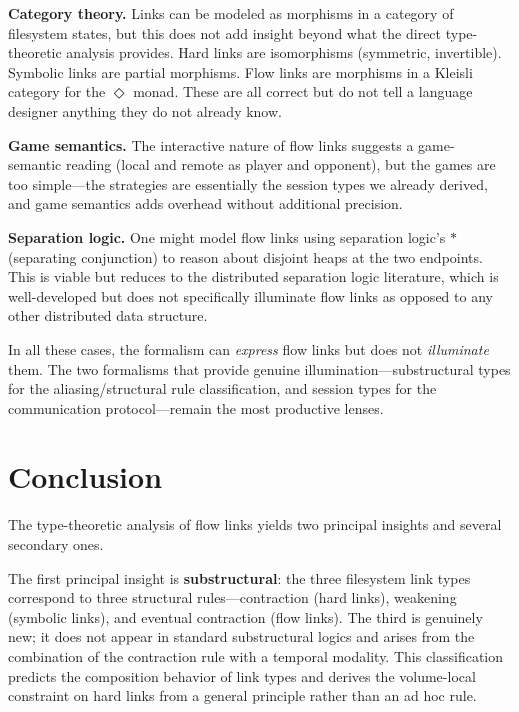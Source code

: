 \documentclass[11pt]{article}
\newcommand{\eventually}{\Diamond}
\begin{document}
\textbf{Category theory.} Links can be modeled as morphisms in a category of
filesystem states, but this does not add insight beyond what the direct
type-theoretic analysis provides. Hard links are isomorphisms (symmetric,
invertible). Symbolic links are partial morphisms. Flow links are morphisms
in a Kleisli category for the $\eventually$ monad. These are all correct
but do not tell a language designer anything they do not already know.

\textbf{Game semantics.} The interactive nature of flow links suggests a game-
semantic reading (local and remote as player and opponent), but the games are
too simple---the strategies are essentially the session types we already
derived, and game semantics adds overhead without additional precision.

\textbf{Separation logic.} One might model flow links using separation logic's
$*$ (separating conjunction) to reason about disjoint heaps at the two
endpoints. This is viable but reduces to the distributed separation logic
literature, which is well-developed but does not specifically illuminate flow
links as opposed to any other distributed data structure.

In all these cases, the formalism can \emph{express} flow links but does not
\emph{illuminate} them. The two formalisms that provide genuine
illumination---substructural types for the aliasing/structural rule
classification, and session types for the communication protocol---remain the
most productive lenses.


\section{Conclusion}

The type-theoretic analysis of flow links yields two principal insights and
several secondary ones.

The first principal insight is \textbf{substructural}: the three filesystem
link types correspond to three structural rules---contraction (hard links),
weakening (symbolic links), and eventual contraction (flow links). The third
is genuinely new; it does not appear in standard substructural logics and
arises from the combination of the contraction rule with a temporal modality.
This classification predicts the composition behavior of link types and
derives the volume-local constraint on hard links from a general principle
rather than an ad hoc rule.
\end{document}
